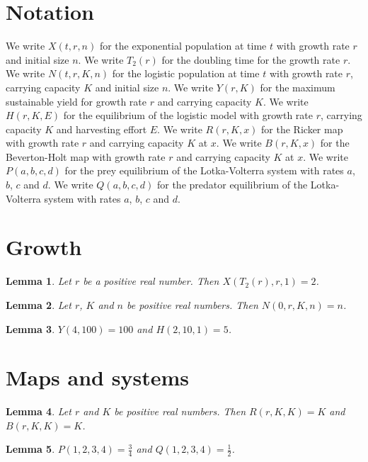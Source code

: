 \documentclass{article}
\newtheorem{lemma}{Lemma}
\begin{document}
\section{Notation}

We write $X(t,r,n)$ for the exponential population at time $t$ with growth rate $r$ and initial size $n$.
We write $T_2(r)$ for the doubling time for the growth rate $r$.
We write $N(t,r,K,n)$ for the logistic population at time $t$ with growth rate $r$, carrying capacity $K$ and initial size $n$.
We write $Y(r,K)$ for the maximum sustainable yield for growth rate $r$ and carrying capacity $K$.
We write $H(r,K,E)$ for the equilibrium of the logistic model with growth rate $r$, carrying capacity $K$ and harvesting effort $E$.
We write $R(r,K,x)$ for the Ricker map with growth rate $r$ and carrying capacity $K$ at $x$.
We write $B(r,K,x)$ for the Beverton-Holt map with growth rate $r$ and carrying capacity $K$ at $x$.
We write $P(a,b,c,d)$ for the prey equilibrium of the Lotka-Volterra system with rates $a$, $b$, $c$ and $d$.
We write $Q(a,b,c,d)$ for the predator equilibrium of the Lotka-Volterra system with rates $a$, $b$, $c$ and $d$.

\section{Growth}

\begin{lemma}\label{doubling}
Let $r$ be a positive real number. Then $X(T_2(r),r,1)=2$.
\end{lemma}

\begin{lemma}\label{logistic}
Let $r$, $K$ and $n$ be positive real numbers. Then $N(0,r,K,n)=n$.
\end{lemma}

\begin{lemma}\label{harvest}
$Y(4,100)=100$ and $H(2,10,1)=5$.
\end{lemma}

\section{Maps and systems}

\begin{lemma}\label{maps}
Let $r$ and $K$ be positive real numbers. Then $R(r,K,K)=K$ and $B(r,K,K)=K$.
\end{lemma}

\begin{lemma}\label{lotka}
$P(1,2,3,4)=\frac34$ and $Q(1,2,3,4)=\frac12$.
\end{lemma}
\end{document}
